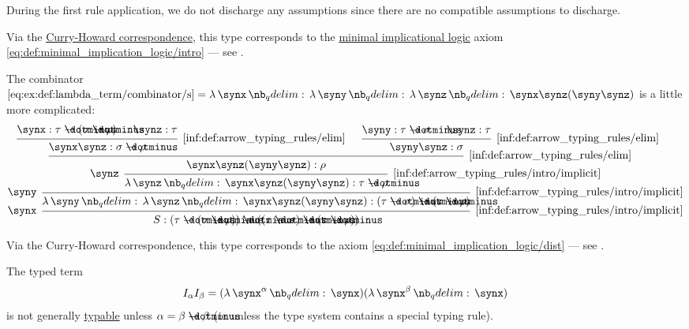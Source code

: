 \begin{example}
\begin{thmenum}
    During the first rule application, we do not discharge any assumptions since there are no compatible assumptions to discharge.

    Via the \hyperref[con:curry_howard_correspondence]{Curry-Howard correspondence}, this type corresponds to the \hyperref[def:minimal_implication_logic]{minimal implicational logic} axiom \eqref{eq:def:minimal_implication_logic/intro} --- see .

     The combinator \( \ref{eq:ex:def:lambda_term/combinator/s} = \qabs \synx \qabs \syny \qabs \synz \synx \synz (\syny \synz) \) is a little more complicated:
    \begin{equation*}
      \begin{prooftree}
        \hypo{ \synx: \tau \synimplies (\sigma \synimplies \rho) }
        \hypo{ \synz: \tau }
        \infer2[\ref{inf:def:arrow_typing_rules/elim}]{ \synx \synz: \sigma \synimplies \rho }

        \hypo{ \syny: \tau \synimplies \sigma }
        \hypo{ \synz: \tau }
        \infer2[\ref{inf:def:arrow_typing_rules/elim}]{ \syny \synz: \sigma }

        \infer2[\ref{inf:def:arrow_typing_rules/elim}]{ \synx \synz (\syny \synz): \rho }
        \infer[left label=\( \synz \)]1[\ref{inf:def:arrow_typing_rules/intro/implicit}]{ \qabs \synz \synx \synz (\syny \synz): \tau \synimplies \rho }
        \infer[left label=\( \syny \)]1[\ref{inf:def:arrow_typing_rules/intro/implicit}]{ \qabs \syny \qabs \synz \synx \synz (\syny \synz): (\tau \synimplies \sigma) \synimplies (\tau \synimplies \rho) }
        \infer[left label=\( \synx \)]1[\ref{inf:def:arrow_typing_rules/intro/implicit}]{ S: (\tau \synimplies (\sigma \synimplies \rho)) \synimplies ((\tau \synimplies \sigma) \synimplies (\tau \synimplies \rho)) }
      \end{prooftree}
    \end{equation*}

    Via the Curry-Howard correspondence, this type corresponds to the axiom \eqref{eq:def:minimal_implication_logic/dist} --- see .

     The typed term
    \begin{equation*}
      I_\alpha I_\beta = (\qabs {\synx^\alpha} \synx) (\qabs {\synx^\beta} \synx)
    \end{equation*}
    is not generally \hyperref[def:typability]{typable} unless \( \alpha = \beta \synimplies \beta \) (or unless the type system contains a special typing rule).


\end{thmenum}
\end{example}
